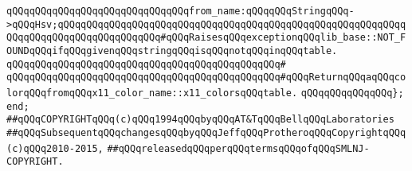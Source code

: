 \newline
\verb|qQQqqQQqqQQqqQQqqQQqqQQqqQQqqQQqfrom_name:qQQqqQQqStringqQQq->qQQqHsv;qQQqqQQqqQQqqQQqqQQqqQQqqQQqqQQqqQQqqQQqqQQqqQQqqQQqqQQqqQQqqQQqqQQqqQQqqQQqqQQqqQQqqQQq#qQQqRaisesqQQqexceptionqQQqlib_base::NOT_FOUNDqQQqifqQQqgivenqQQqstringqQQqisqQQqnotqQQqinqQQqtable.|\newline
\verb|qQQqqQQqqQQqqQQqqQQqqQQqqQQqqQQqqQQqqQQqqQQqqQQq#|\newline
\verb|qQQqqQQqqQQqqQQqqQQqqQQqqQQqqQQqqQQqqQQqqQQqqQQq#qQQqReturnqQQqaqQQqcolorqQQqfromqQQqx11_color_name::x11_colorsqQQqtable.|\newline
\verb|qQQqqQQqqQQqqQQq};|\newline
\verb|end;|\newline
\newline
\verb|##qQQqCOPYRIGHTqQQq(c)qQQq1994qQQqbyqQQqAT&TqQQqBellqQQqLaboratories|\newline
\verb|##qQQqSubsequentqQQqchangesqQQqbyqQQqJeffqQQqProtheroqQQqCopyrightqQQq(c)qQQq2010-2015,|\newline
\verb|##qQQqreleasedqQQqperqQQqtermsqQQqofqQQqSMLNJ-COPYRIGHT.|\newline


